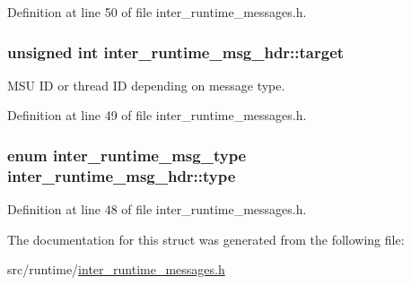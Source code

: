 Definition at line 50 of file inter\-\_\-runtime\-\_\-messages.\-h.

\hypertarget{structinter__runtime__msg__hdr_ab55150bdbe4ae70e8e647f29f1568920}{
\subsubsection[{target}]{\setlength{\rightskip}{0pt plus 5cm}unsigned int inter\-\_\-runtime\-\_\-msg\-\_\-hdr\-::target}}\label{structinter__runtime__msg__hdr_ab55150bdbe4ae70e8e647f29f1568920}


M\-S\-U I\-D or thread I\-D depending on message type. 



Definition at line 49 of file inter\-\_\-runtime\-\_\-messages.\-h.

\hypertarget{structinter__runtime__msg__hdr_aa3fd1b24d760f993758fde89bc392667}{
\subsubsection[{type}]{\setlength{\rightskip}{0pt plus 5cm}enum {\bf inter\-\_\-runtime\-\_\-msg\-\_\-type} inter\-\_\-runtime\-\_\-msg\-\_\-hdr\-::type}}\label{structinter__runtime__msg__hdr_aa3fd1b24d760f993758fde89bc392667}


Definition at line 48 of file inter\-\_\-runtime\-\_\-messages.\-h.



The documentation for this struct was generated from the following file\-:\begin{DoxyCompactItemize}
\item 
src/runtime/\hyperlink{inter__runtime__messages_8h}{inter\-\_\-runtime\-\_\-messages.\-h}\end{DoxyCompactItemize}
